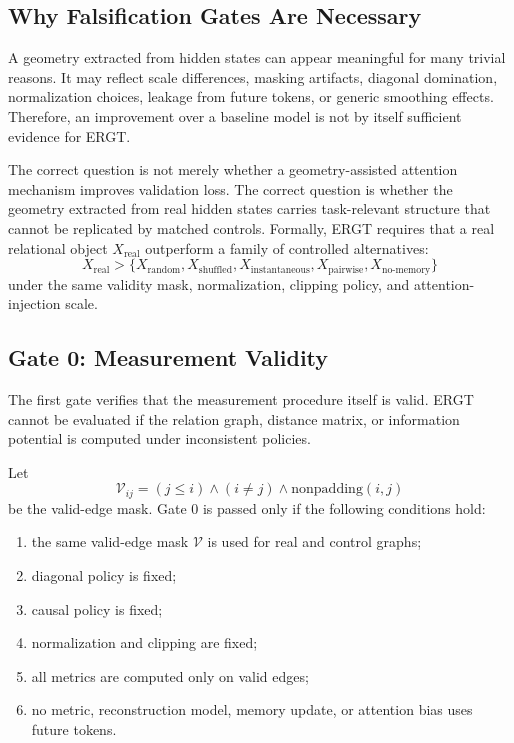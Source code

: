 \documentclass[11pt]{article}
\begin{document}
\subsection{Why Falsification Gates Are Necessary}

A geometry extracted from hidden states can appear meaningful for many trivial reasons. It may reflect scale differences, masking artifacts, diagonal domination, normalization choices, leakage from future tokens, or generic smoothing effects. Therefore, an improvement over a baseline model is not by itself sufficient evidence for ERGT.

The correct question is not merely whether a geometry-assisted attention mechanism improves validation loss. The correct question is whether the geometry extracted from real hidden states carries task-relevant structure that cannot be replicated by matched controls. Formally, ERGT requires that a real relational object $X_{\mathrm{real}}$ outperform a family of controlled alternatives:
\[
X_{\mathrm{real}}
>
\{X_{\mathrm{random}},X_{\mathrm{shuffled}},X_{\mathrm{instantaneous}},X_{\mathrm{pairwise}},X_{\mathrm{no\text{-}memory}}\}
\]
under the same validity mask, normalization, clipping policy, and attention-injection scale.

\subsection{Gate 0: Measurement Validity}

The first gate verifies that the measurement procedure itself is valid. ERGT cannot be evaluated if the relation graph, distance matrix, or information potential is computed under inconsistent policies.

Let
\[
\mathcal{V}_{ij}
=
(j\leq i)
\land
(i\neq j)
\land
\mathrm{nonpadding}(i,j)
\]
be the valid-edge mask. Gate 0 is passed only if the following conditions hold:
\begin{enumerate}[leftmargin=2em]
    \item the same valid-edge mask $\mathcal{V}$ is used for real and control graphs;
    \item diagonal policy is fixed;
    \item causal policy is fixed;
    \item normalization and clipping are fixed;
    \item all metrics are computed only on valid edges;
    \item no metric, reconstruction model, memory update, or attention bias uses future tokens.
\end{enumerate}
\end{document}

